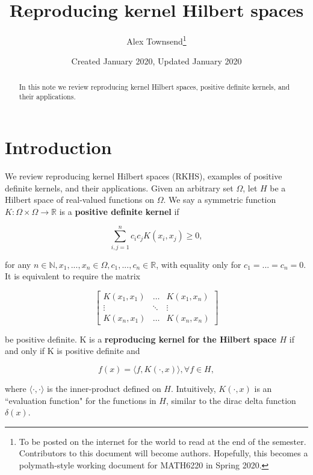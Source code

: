 \documentclass{article}
\title{Reproducing kernel Hilbert spaces}
\author{Alex Townsend\footnote{To be posted on the internet for the world to read at the end of the semester. Contributors to this document will become authors. Hopefully, this becomes a polymath-style working document for MATH6220 in Spring 2020.}}
\date{Created January 2020, Updated January 2020}
\theoremstyle{definition}
\theoremstyle{remark}
\begin{document}
\maketitle
\begin{abstract} 
In this note we review reproducing kernel Hilbert spaces, positive definite kernels, and their applications. 
\end{abstract}

\tableofcontents

\section{Introduction} %

We review reproducing kernel Hilbert spaces (RKHS), examples of positive definite kernels, and their applications. Given an arbitrary set $\Omega$, let $H$ be a Hilbert space of real-valued functions on $\Omega$. We say a symmetric function $K: \Omega \times \Omega \rightarrow \mathbb{R}$ is a \textbf{positive definite kernel} if

\begin{equation}
    \sum_{i, j = 1}^n c_i c_j K(x_i, x_j) \geq 0,
\end{equation}

for any $n \in \mathbb{N}, x_1, ..., x_n \in \Omega, c_1, ..., c_n \in \mathbb{R}$, with equality only for $c_1 = ... = c_n = 0$. It is equivalent to require the matrix

\begin{equation*}
    \begin{bmatrix}
    K(x_1, x_1) & \dots & K(x_1, x_n) \\
    \vdots & \ddots & \vdots \\
    K(x_n, x_1) & \dots & K(x_n, x_n)
\end{bmatrix}
\end{equation*}

be positive definite. K is a \textbf{reproducing kernel for the Hilbert space $H$} if and only if K is positive definite and

\begin{equation}
    f(x) = \langle f, K(\cdot, x) \rangle, \forall f \in H,
\end{equation}

where $\langle \cdot, \cdot \rangle$ is the inner-product defined on $H$. Intuitively, $K(\cdot, x)$ is an ``evaluation function" for the functions in $H$, similar to the dirac delta function $\delta(x)$.
\end{document}
